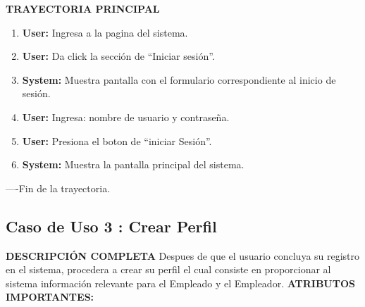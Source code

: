 \textbf{TRAYECTORIA PRINCIPAL}			
\begin{enumerate}			
\item \textbf{	User: 	}	Ingresa a la pagina del sistema.
\item \textbf{	User: 	}	Da click la sección de “Iniciar  sesión”.
\item \textbf{	System: 	}	Muestra pantalla con el formulario correspondiente al inicio de sesión.
\item \textbf{	User: 	}	Ingresa: nombre de usuario y contraseña.
\item \textbf{	User: 	}	Presiona el boton de “iniciar Sesión”.
\item \textbf{	System: 	}	Muestra la pantalla principal del sistema.
			
			
			
\end{enumerate}			
----Fin de la trayectoria.			





\newpage			
\subsection{Caso de Uso 	3	: Crear Perfil	}
		\textbf{DESCRIPCIÓN COMPLETA}	
		\newline 	
		Despues de que el usuario concluya su registro en el sistema, procedera a crear su perfil el cual consiste en proporcionar al sistema información relevante para el Empleado y el Empleador.	\newline \newline
		\textbf{ATRIBUTOS IMPORTANTES:}	


